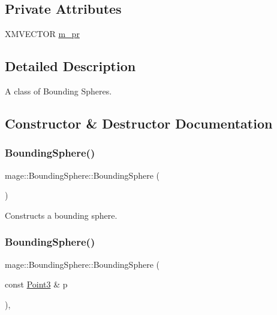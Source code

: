 \subsection*{Private Attributes}
\begin{DoxyCompactItemize}
\item 
X\+M\+V\+E\+C\+T\+OR \mbox{\hyperlink{classmage_1_1_bounding_sphere_a787aea4f26cca30e3c30d85da3533b9d}{m\+\_\+pr}}
\end{DoxyCompactItemize}


\subsection{Detailed Description}
A class of Bounding Spheres. 

\subsection{Constructor \& Destructor Documentation}
\mbox{\label{classmage_1_1_bounding_sphere_a3bf22ae012630101af6578173958aebc}} 
\subsubsection{\texorpdfstring{Bounding\+Sphere()}{BoundingSphere()}\hspace{0.1cm}{\footnotesize\ttfamily [1/8]}}
{\footnotesize\ttfamily mage\+::\+Bounding\+Sphere\+::\+Bounding\+Sphere (\begin{DoxyParamCaption}{ }\end{DoxyParamCaption})\hspace{0.3cm}{\ttfamily [noexcept]}}

Constructs a bounding sphere. \mbox{\label{classmage_1_1_bounding_sphere_a8f70fd7013b1d2a22545ab659847840f}} 
\subsubsection{\texorpdfstring{Bounding\+Sphere()}{BoundingSphere()}\hspace{0.1cm}{\footnotesize\ttfamily [2/8]}}
{\footnotesize\ttfamily mage\+::\+Bounding\+Sphere\+::\+Bounding\+Sphere (\begin{DoxyParamCaption}\item[{const \mbox{\hyperlink{structmage_1_1_point3}{Point3}} \&}]{p }\end{DoxyParamCaption})\hspace{0.3cm}{\ttfamily [explicit]}, {\ttfamily [noexcept]}}

